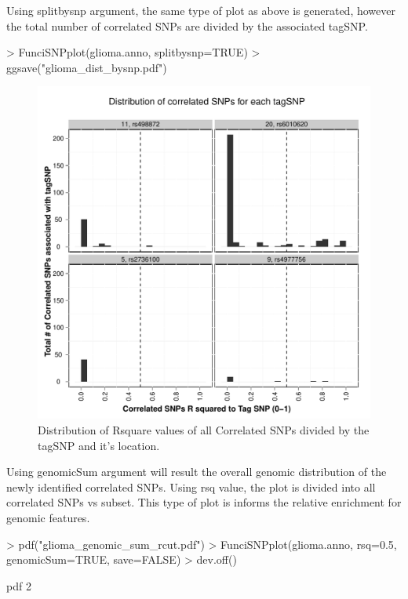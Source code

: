 \documentclass[a4paper]{article}
\begin{document}
Using splitbysnp argument, the same type of plot as above is generated, however
 the total number of correlated SNPs are divided by the associated tagSNP.
\begin{Schunk}
\begin{Sinput}
> FunciSNPplot(glioma.anno, splitbysnp=TRUE)
> ggsave("glioma_dist_bysnp.pdf")
\end{Sinput}
\end{Schunk}
\begin{figure}[ht!]
\begin{center}
\includegraphics{glioma_dist_bysnp.pdf}
\caption{\label{fig:glioma_dist_bysnp.pdf} Distribution of Rsquare values of all
 Correlated SNPs divided by the tagSNP and it's location.}
{\footnotesize{}}
\end{center}
\end{figure}
Using genomicSum argument will result the overall genomic distribution of the 
newly identified correlated SNPs.  Using rsq value, the plot is divided into 
all correlated SNPs vs subset. This type of plot is informs the relative 
enrichment for genomic features.
\begin{Schunk}
\begin{Sinput}
> pdf("glioma_genomic_sum_rcut.pdf")
> FunciSNPplot(glioma.anno, rsq=0.5, genomicSum=TRUE, save=FALSE)
> dev.off()
\end{Sinput}
\begin{Soutput}
pdf 
  2 
\end{Soutput}
\end{Schunk}
\end{document}
